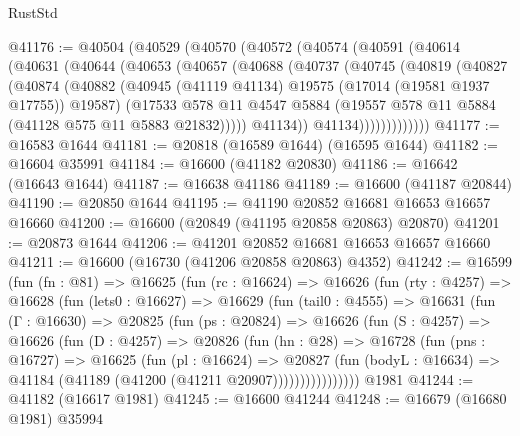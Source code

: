 \begin{lexlean}{RustStd}
\begin{coremodule}
{\begin{coremodule}
{{{{{{{{{{{{{{{{{{{{{{{{{{{{{{{{{{{{{{{{{{{{{{{{{{{{{{{@41176 := @40504
    (@40529
      (@40570
        (@40572
          (@40574
            (@40591
              (@40614
                (@40631
                  (@40644
                    (@40653
                      (@40657
                        (@40688
                          (@40737
                            (@40745
                              (@40819
                                (@40827
                                  (@40874
                                    (@40882
                                      (@40945
                                        (@41119 @41134)
                                        @19575
                                        (@17014 (@19581 @1937 @17755))
                                        @19587)
                                      (@17533
                                        @578
                                        @11
                                        @4547
                                        @5884
                                        (@19557 @578 @11 @5884 (@41128 @575 @11 @5883 @21832)))))
                                  @41134))
                              @41134)))))))))))))
@41177 := @16583 @1644
@41181 := @20818 (@16589 @1644) (@16595 @1644)
@41182 := @16604 @35991
@41184 := @16600 (@41182 @20830)
@41186 := @16642 (@16643 @1644)
@41187 := @16638 @41186
@41189 := @16600 (@41187 @20844)
@41190 := @20850 @1644
@41195 := @41190 @20852 @16681 @16653 @16657 @16660
@41200 := @16600 (@20849 (@41195 @20858 @20863) @20870)
@41201 := @20873 @1644
@41206 := @41201 @20852 @16681 @16653 @16657 @16660
@41211 := @16600 (@16730 (@41206 @20858 @20863) @4352)
@41242 := @16599
    (fun (fn : @81) =>
    @16625
      (fun (rc : @16624) =>
      @16626
        (fun (rty : @4257) =>
        @16628
          (fun (lets0 : @16627) =>
          @16629
            (fun (tail0 : @4555) =>
            @16631
              (fun (Γ : @16630) =>
              @20825
                (fun (ps : @20824) =>
                @16626
                  (fun (S : @4257) =>
                  @16626
                    (fun (D : @4257) =>
                    @20826
                      (fun (hn : @28) =>
                      @16728
                        (fun (pns : @16727) =>
                        @16625
                          (fun (pl : @16624) =>
                          @20827
                            (fun (bodyL : @16634) =>
                            @41184 (@41189 (@41200 (@41211 @20907))))))))))))))))
    @1981
@41244 := @41182 (@16617 @1981)
@41245 := @16600 @41244
@41248 := @16679 (@16680 @1981) @35994
}}}}}}}}}}}}}}}}}}}}}}}}}}}}}}}}}}}}}}}}}}}}}}}}}}}}}}}
\end{coremodule}}
\end{coremodule}
\end{lexlean}
